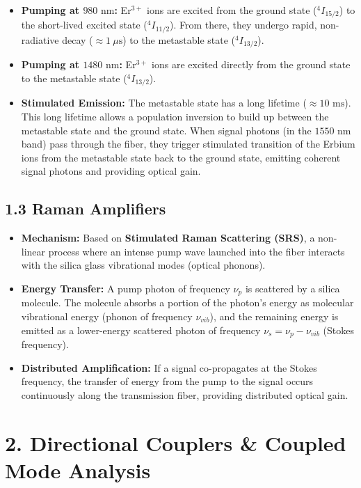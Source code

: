 \begin{itemize}
  \item   \textbf{Pumping at $980\text{ nm}$:} Er$^{3+}$ ions are excited from the ground state ($^4I_{15/2}$) to the short-lived excited state ($^4I_{11/2}$). From there, they undergo rapid, non-radiative decay ($\approx 1\ \mu\text{s}$) to the metastable state ($^4I_{13/2}$).
  \item   \textbf{Pumping at $1480\text{ nm}$:} Er$^{3+}$ ions are excited directly from the ground state to the metastable state ($^4I_{13/2}$).
  \item   \textbf{Stimulated Emission:} The metastable state has a long lifetime ($\approx 10\text{ ms}$). This long lifetime allows a population inversion to build up between the metastable state and the ground state. When signal photons (in the $1550\text{ nm}$ band) pass through the fiber, they trigger stimulated transition of the Erbium ions from the metastable state back to the ground state, emitting coherent signal photons and providing optical gain.
\end{itemize}


\subsection{1.3 Raman Amplifiers}
\begin{itemize}
  \item   \textbf{Mechanism:} Based on \textbf{Stimulated Raman Scattering (SRS)}, a non-linear process where an intense pump wave launched into the fiber interacts with the silica glass vibrational modes (optical phonons).
  \item   \textbf{Energy Transfer:} A pump photon of frequency $\nu_p$ is scattered by a silica molecule. The molecule absorbs a portion of the photon's energy as molecular vibrational energy (phonon of frequency $\nu_{vib}$), and the remaining energy is emitted as a lower-energy scattered photon of frequency $\nu_s = \nu_p - \nu_{vib}$ (Stokes frequency).
  \item   \textbf{Distributed Amplification:} If a signal co-propagates at the Stokes frequency, the transfer of energy from the pump to the signal occurs continuously along the transmission fiber, providing distributed optical gain.
\end{itemize}


\section{2. Directional Couplers \& Coupled Mode Analysis}

